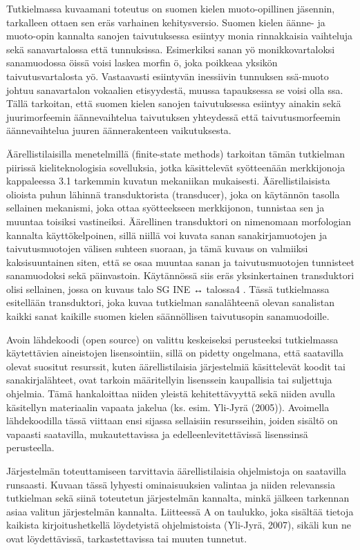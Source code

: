 \documentclass[free]{flammie}
\begin{document}
Tutkielmassa kuvaamani toteutus
on suomen kielen muoto-opillinen jäsennin, tarkalleen ottaen sen eräs varhainen
kehitysversio. Suomen kielen äänne- ja muoto-opin kannalta sanojen taivutuksessa
esiintyy monia rinnakkaisia vaihteluja sekä sanavartalossa että tunnuksissa.
Esimerkiksi sanan yö monikkovartaloksi sanamuodossa öissä voisi laskea morfin ö,
joka poikkeaa yksikön taivutusvartalosta yö. Vastaavasti esiintyvän inessiivin
tunnuksen ssä-muoto johtuu sanavartalon vokaalien etisyydestä, muussa
tapauksessa se voisi olla ssa. Tällä tarkoitan, että suomen kielen sanojen
taivutuksessa esiintyy ainakin sekä juurimorfeemin äännevaihtelua taivutuksen
yhteydessä että taivutusmorfeemin äännevaihtelua juuren äännerakenteen
vaikutuksesta.

Äärellistilaisilla menetelmillä (finite-state methods) tarkoitan
tämän tutkielman piirissä kieliteknologisia sovelluksia, jotka käsittelevät
syötteenään merkkijonoja kappaleessa 3.1 tarkemmin kuvatun mekaniikan
mukaisesti. Äärellistilaisista olioista puhun lähinnä transduktorista
(transducer), joka on käytännön tasolla sellainen mekanismi, joka ottaa
syötteekseen merkkijonon, tunnistaa sen ja muuntaa toisiksi vastineiksi.
Äärellinen transduktori on nimenomaan morfologian kannalta käyttökelpoinen,
sillä niillä voi kuvata sanan sanakirjamuotojen ja taivutusmuotojen välisen
suhteen suoraan, ja tämä kuvaus on valmiiksi kaksisuuntainen siten, että se osaa
muuntaa sanan ja taivutusmuotojen tunnisteet sanamuodoksi sekä päinvastoin.
Käytännössä siis eräs yksinkertainen transduktori olisi sellainen, jossa on
kuvaus talo SG INE ↔ talossa4 . Tässä tutkielmassa esitellään transduktori, joka
kuvaa tutkielman sanalähteenä olevan sanalistan kaikki sanat kaikille suomen
kielen säännöllisen taivutusopin sanamuodoille.

Avoin lähdekoodi (open source)
on valittu keskeiseksi perusteeksi tutkielmassa käytettävien aineistojen
lisensointiin, sillä on pidetty ongelmana, että saatavilla olevat suositut
resurssit, kuten äärellistilaisia järjestelmiä käsittelevät koodit tai
sanakirjalähteet, ovat tarkoin määritellyin lisenssein kaupallisia tai
suljettuja ohjelmia. Tämä hankaloittaa niiden yleistä kehitettävyyttä sekä
niiden avulla käsitellyn materiaalin vapaata jakelua (ks. esim. Yli-Jyrä
(2005)). Avoimella lähdekoodilla tässä viittaan ensi sijassa sellaisiin
resursseihin, joiden sisältö on vapaasti saatavilla, mukautettavissa ja
edelleenlevitettävissä lisenssinsä perusteella.

Järjestelmän toteuttamiseen
tarvittavia äärellistilaisia ohjelmistoja on saatavilla
runsaasti. Kuvaan tässä lyhyesti ominaisuuksien valintaa ja niiden relevanssia tutkielman sekä siinä toteutetun järjestelmän kannalta, minkä jälkeen tarkennan asiaa
valitun järjestelmän kannalta. Liitteessä A on taulukko, joka sisältää tietoja kaikista kirjoitushetkellä löydetyistä ohjelmistoista (Yli-Jyrä, 2007), sikäli kun ne ovat
löydettävissä, tarkastettavissa tai muuten tunnetut.
\end{document}

